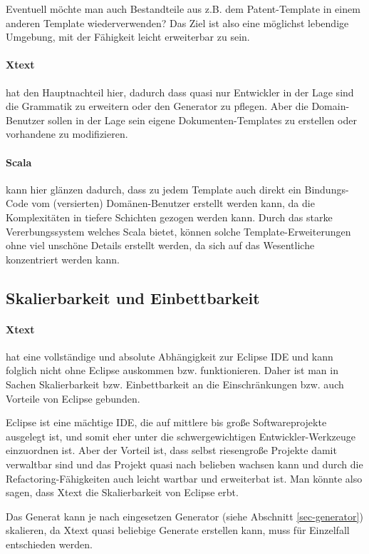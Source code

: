 Eventuell möchte man auch Bestandteile aus z.B. dem Patent-Template in
einem anderen Template wiederverwenden? Das Ziel ist also eine
möglichst lebendige Umgebung, mit der Fähigkeit leicht erweiterbar zu sein.

\paragraph{Xtext} hat den Hauptnachteil hier, dadurch dass quasi nur
Entwickler in der Lage sind die Grammatik zu erweitern oder den
Generator zu pflegen. Aber die Domain-Benutzer sollen in der Lage sein
eigene Dokumenten-Templates zu erstellen oder vorhandene zu modifizieren.

\paragraph{Scala} kann hier glänzen dadurch, dass zu jedem Template auch
direkt ein Bindungs-Code vom (versierten) Domänen-Benutzer erstellt
werden kann, da die Komplexitäten in tiefere Schichten gezogen werden kann.
Durch das starke Vererbungssystem welches Scala bietet, können solche
Template-Erweiterungen ohne viel unschöne Details erstellt werden, da sich
auf das Wesentliche konzentriert werden kann.


\subsection{Skalierbarkeit und Einbettbarkeit}\label{sec-scalierEinbett}

\paragraph{Xtext} hat eine vollständige und absolute Abhängigkeit
zur Eclipse IDE und kann folglich nicht ohne Eclipse auskommen bzw.
funktionieren. Daher ist man in Sachen Skalierbarkeit bzw. Einbettbarkeit
an die Einschränkungen bzw. auch Vorteile von Eclipse gebunden.

Eclipse ist eine mächtige IDE, die auf mittlere bis große Softwareprojekte
ausgelegt ist, und somit eher unter die schwergewichtigen Entwickler-Werkzeuge
einzuordnen ist. Aber der Vorteil ist, dass selbst riesengroße Projekte
damit verwaltbar sind und das Projekt quasi nach belieben wachsen kann und
durch die Refactoring-Fähigkeiten auch leicht wartbar und erweiterbat ist.
Man könnte also sagen, dass Xtext die Skalierbarkeit von Eclipse erbt.

Das Generat kann je nach eingesetzen Generator (siehe Abschnitt
\ref{sec-generator}) skalieren, da Xtext quasi beliebige Generate erstellen
kann, muss für Einzelfall entschieden werden.

